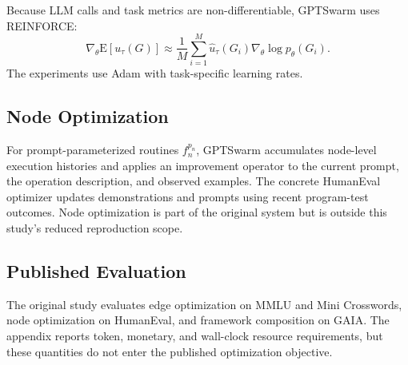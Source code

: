 Because LLM calls and task metrics are non-differentiable, GPTSwarm uses REINFORCE:
\begin{equation}
 \nabla_{\theta}\mathrm{E}[u_{\tau}(G)] \approx
 \frac{1}{M}\sum_{i=1}^{M}\hat{u}_{\tau}(G_i)
 \nabla_{\theta}\log p_{\theta}(G_i).
\end{equation}
The experiments use Adam with task-specific learning rates.

\subsection{Node Optimization}

For prompt-parameterized routines $f_n^{p_n}$, GPTSwarm accumulates node-level execution histories and applies an improvement operator to the current prompt, the operation description, and observed examples. The concrete HumanEval optimizer updates demonstrations and prompts using recent program-test outcomes. Node optimization is part of the original system but is outside this study's reduced reproduction scope.

\subsection{Published Evaluation}

The original study evaluates edge optimization on MMLU and Mini Crosswords, node optimization on HumanEval, and framework composition on GAIA. The appendix reports token, monetary, and wall-clock resource requirements, but these quantities do not enter the published optimization objective.

